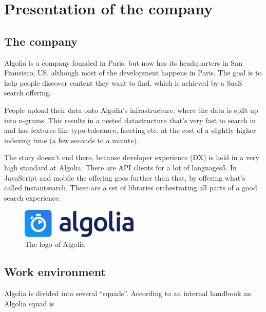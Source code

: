 
\chapter{Presentation of the company} %
\label{chp:presentation}

\section{The company} %
\label{sec:company}

Algolia\cite{algolia-home} is a company founded in Paris, but now has its headquarters in San Fransisco, US, although most of the development happens in Paris. The goal is to help people discover content they want to find, which is achieved by a SaaS search offering.

People upload their data onto Algolia’s infrastructure, where the data is split up into n-grams\cite{kimbrell1988searching}. This results in a nested datastructure that’s very fast to search in and has features like typo-tolerance, faceting etc. at the cost of a slightly higher indexing time (a few seconds to a minute).\cite{paris-nlp-algolia}

The story doesn’t end there, because developer experience (DX) is held in a very high standard at Algolia. There are API clients for a lot of languages5. In JavaScript and mobile the offering goes further than that, by offering what’s called instantsearch\cite{instantsearch-js}\cite{react-instantsearch}\cite{instantsearch-android}\cite{instantsearch-ios}. These are a set of libraries orchestrating all parts of a good search experience.

\begin{figure}[H]
  \label{figure:company-logo}
  \centering
  \includegraphics[width=0.5\textwidth]{../assets/algolia-logo-light.pdf}
  \caption{The logo of Algolia \cite{algolia-press}}
\end{figure}

\section{Work environment}
\label{sec:work-environment}

Algolia is divided into several ``squads''. According to an internal handbook an Algolia squad is

